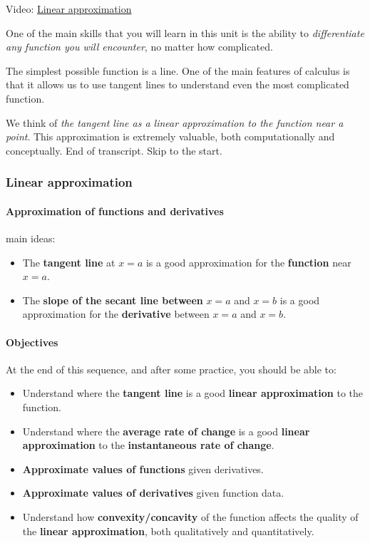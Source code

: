 \documentclass[pdftex, brazil, 12pt, twoside]{article}
\begin{document}
Video: \href{https://www.youtube.com/watch?v=iJnecCE\_tlM}{Linear approximation}

One of the main skills that you will learn in this unit
is the ability to \emph{differentiate any function
you will encounter}, no matter how complicated.

The simplest possible function is a line.
One of the main features of calculus
is that it allows us to use tangent lines
to understand even the most complicated function.

We think of \emph{the tangent line as a linear approximation
to the function near a point}.
This approximation is extremely valuable,
both computationally and conceptually.
End of transcript. Skip to the start.

\subsubsection{Linear approximation}
\label{u2-linear-approx-obj}

\paragraph{Approximation of functions and derivatives} main ideas:
\begin{itemize}[noitemsep]
\item The \textbf{tangent line} at $x=a$ is a good approximation for the \textbf{function}
  near $x=a$.
\item The \textbf{slope of the secant line between} $x=a$ and $x=b$ is a good
  approximation for the \textbf{derivative} between $x=a$ and $x=b$.
\end{itemize}

\paragraph{Objectives} At the end of this sequence, and after some practice, you
should be able to:
\begin{itemize}[noitemsep]
\item Understand where the \textbf{tangent line} is a good \textbf{linear approximation} to the function.
\item Understand where the \textbf{average rate of change} is a good \textbf{linear approximation}
  to the \textbf{instantaneous rate of change}.
\item \textbf{Approximate values of functions} given derivatives.
\item \textbf{Approximate values of derivatives} given function data.
\item Understand how \textbf{convexity/concavity} of the function affects the quality
  of the \textbf{linear approximation}, both qualitatively and quantitatively.
\end{itemize}
\end{document}
